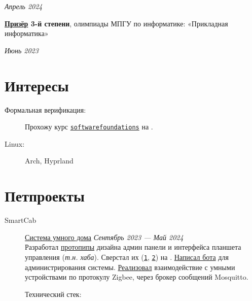 \documentclass[margin,line]{resume}
\begin{document}
\begin{resume}
\hfill \textsl{Апрель 2024}

\textbf{\href{https://github.com/alchemmist/CV/blob/main/attachments/informatics-olimpic.pdf}{Призёр}
3-й степени}, олимпиады МПГУ по информатике:
«Прикладная информатика»
\vspace{-3mm}

\hfill \textsl{Июнь 2023}

\section{\mysidestyle Интересы}\vspace{1mm}
\begin{description}
  \item[Формальная верификация:] Прохожу курс
    \texttt{\href{https://softwarefoundations.cis.upenn.edu}{softwarefoundations}}
    на .
  \item[Linux:] Arch, Hyprland
\end{description}
\vfill

\section{\mysidestyle Петпроекты}\vspace{2mm}

\begin{description}

  \item[SmartCab]\small{\href{https://github.com/smart-cab}{Система
      умного дома} \hfill
    \textsl{Сентябрь 2023 — Май 2024\vspace{2mm}}}\\
    Разработал
    \href{https://www.figma.com/design/8H1tFpxgmIDV1xp06ndi73/SmartCab?node-id=0-1&p=f}{протопипы}
    дизайна админ панели и интерфейса планшета управления
    (\textit{т.н. хаба}). Сверстал их
    (\texttt{\href{https://github.com/smart-cab/smartcab-hub/tree/main/frontend/src}{1}},
    \texttt{\href{https://github.com/smart-cab/smartcab-dashboard/tree/main/frontend/src}{2}})
    на .
    \href{https://github.com/smart-cab/smartcab-bot}{Написал бота}
    для администрирования системы.
    \href{https://github.com/smart-cab/smartcab-hub/blob/main/backend/smartcab/interface/mqtt.py}{Реализовал}
    взаимодействие с умными устройствами по протокулу Zigbee, через
    брокер сообщений Mosquitto.

    Технический стек:
    \vspace{3mm}


\end{description}
\end{resume}
\end{document}
